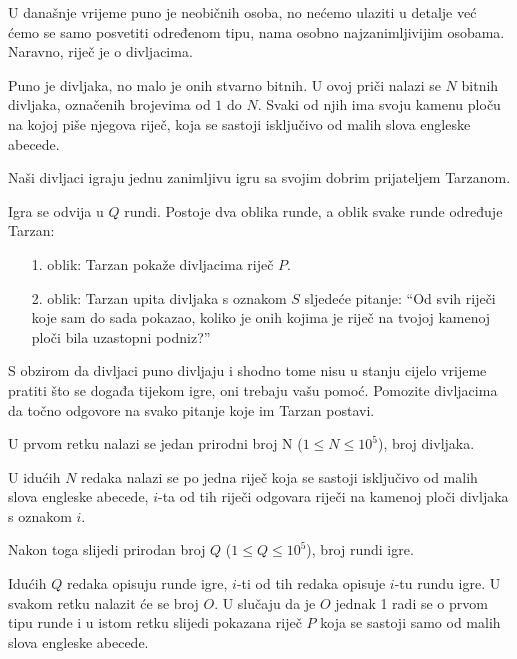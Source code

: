 \renewcommand{\taskname}{DIVLJAK}
\renewcommand{\timelimit}{4 sekunde}
\renewcommand{\memorylimit}{768 MB}
\renewcommand{\score}{160 bodova}

U današnje vrijeme puno je neobičnih osoba, no nećemo ulaziti u detalje već ćemo se samo posvetiti određenom tipu, nama osobno najzanimljivijim osobama. Naravno, riječ je o divljacima.

Puno je divljaka, no malo je onih stvarno bitnih. U ovoj priči nalazi se $N$ bitnih divljaka, označenih brojevima od $1$ do $N$. Svaki od njih ima svoju kamenu ploču na kojoj piše njegova riječ, koja se sastoji isključivo od malih slova engleske abecede. 

Naši divljaci igraju jednu zanimljivu igru sa svojim dobrim prijateljem Tarzanom.

Igra se odvija u $Q$ rundi. Postoje dva oblika runde, a oblik svake runde određuje Tarzan:
{
\begin{itemize}
\item[1. oblik:] Tarzan pokaže divljacima riječ $P$.
\item[2. oblik:] Tarzan upita divljaka s oznakom $S$ sljedeće pitanje: “Od svih riječi koje sam do sada pokazao, koliko je onih kojima je riječ na tvojoj kamenoj ploči bila uzastopni podniz?”
\end{itemize}}

S obzirom da divljaci puno divljaju i shodno tome nisu u stanju cijelo vrijeme pratiti što se događa tijekom igre, oni trebaju vašu pomoć. Pomozite divljacima da točno odgovore na svako pitanje koje im Tarzan postavi.

\strut


U prvom retku nalazi se jedan prirodni broj N ($1 \leqslant N \leqslant 10^5$), broj divljaka.

U idućih $N$ redaka nalazi se po jedna riječ koja se sastoji isključivo od malih slova engleske abecede, $i$-ta od tih riječi odgovara riječi na kamenoj ploči divljaka s oznakom $i$.

Nakon toga slijedi prirodan broj $Q$ ($1 \leqslant Q \leqslant 10^5$), broj rundi igre.

Idućih $Q$ redaka opisuju runde igre, $i$-ti od tih redaka opisuje $i$-tu rundu igre.
U svakom retku nalazit će se broj $O$. U slučaju da je $O$ jednak 1 radi se o prvom tipu runde i u istom retku slijedi pokazana riječ $P$ koja se sastoji samo od malih slova engleske abecede.

